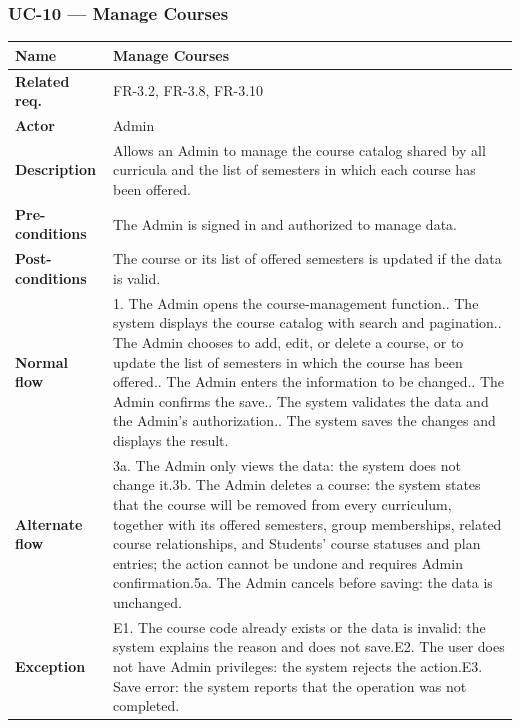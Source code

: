 \subsubsection{UC-10 --- Manage Courses}
\begin{longtable}{|p{}|p{}|}
\hline
\textbf{Name} & Manage Courses \\
\hline
\textbf{Related req.} & FR-3.2, FR-3.8, FR-3.10 \\
\hline
\textbf{Actor} & Admin \\
\hline
\textbf{Description} & Allows an Admin to manage the course catalog shared by all curricula and the list of semesters in which each course has been offered. \\
\hline
\textbf{Pre-conditions} & The Admin is signed in and authorized to manage data. \\
\hline
\textbf{Post-conditions} & The course or its list of offered semesters is updated if the data is valid. \\
\hline
\textbf{Normal flow} & 1. The Admin opens the course-management function.\newline 2. The system displays the course catalog with search and pagination.\newline 3. The Admin chooses to add, edit, or delete a course, or to update the list of semesters in which the course has been offered.\newline 4. The Admin enters the information to be changed.\newline 5. The Admin confirms the save.\newline 6. The system validates the data and the Admin's authorization.\newline 7. The system saves the changes and displays the result. \\
\hline
\textbf{Alternate flow} & 3a. The Admin only views the data: the system does not change it.\newline 3b. The Admin deletes a course: the system states that the course will be removed from every curriculum, together with its offered semesters, group memberships, related course relationships, and Students' course statuses and plan entries; the action cannot be undone and requires Admin confirmation.\newline 5a. The Admin cancels before saving: the data is unchanged. \\
\hline
\textbf{Exception} & E1. The course code already exists or the data is invalid: the system explains the reason and does not save.\newline E2. The user does not have Admin privileges: the system rejects the action.\newline E3. Save error: the system reports that the operation was not completed. \\
\hline
\end{longtable}

